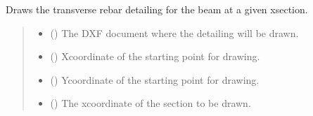 \documentclass[a4paper,10pt,english]{sphinxmanual}
\begin{document}
\begin{fulllineitems}
\begin{fulllineitems}
\label{\detokenize{API:etacad.beam.Beam.draw_transverse_rebar_detailing}}
\pysigstartsignatures
{}
\pysigstopsignatures
\sphinxAtStartPar
Draws the transverse rebar detailing for the beam at a given x\sphinxhyphen{}section.
\begin{quote}\begin{description}
\begin{itemize}
\item {} 
\sphinxAtStartPar
{} () \textendash{} The DXF document where the detailing will be drawn.

\item {} 
\sphinxAtStartPar
{} (\sphinxstyleliteralemphasis{\sphinxupquote{, }}) \textendash{} X\sphinxhyphen{}coordinate of the starting point for drawing.

\item {} 
\sphinxAtStartPar
{} (\sphinxstyleliteralemphasis{\sphinxupquote{, }}) \textendash{} Y\sphinxhyphen{}coordinate of the starting point for drawing.

\item {} 
\sphinxAtStartPar
{} (\sphinxstyleliteralemphasis{\sphinxupquote{, }}) \textendash{} The x\sphinxhyphen{}coordinate of the section to be drawn.


\end{itemize}
\end{description}
\end{quote}
\end{fulllineitems}
\end{fulllineitems}
\end{document}
